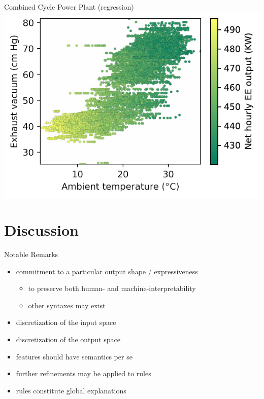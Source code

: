 \documentclass[presentation]{beamer}\mode<presentation>{\usetheme{AMSBolognaFC}}
\begin{document}
\begin{frame}[allowframebreaks]{Combined Cycle Power Plant (regression)}\centering
    \includegraphics[width=.6\linewidth]{figures/REG/ccpp-samples.pdf}

    \framebreak


    \framebreak

    

    \framebreak

    

    \framebreak


\end{frame}

\section{Discussion}

\begin{frame}{Notable Remarks}
    \begin{itemize}
        \item commitment to a particular output shape / expressiveness
        \begin{itemize}
            \item to preserve both human- and machine-interpretability
            \item other syntaxes may exist
        \end{itemize}
        \item discretization of the input space
        \item discretization of the output space
        \item features should have semantics per se
        \item further refinements may be applied to rules
        \item rules constitute global explanations
    \end{itemize}
\end{frame}
\end{document}
